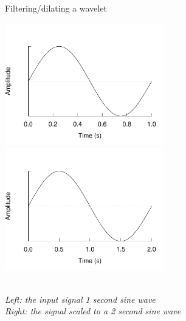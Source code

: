 \begin{figure}[h]
\caption{Filtering/dilating a wavelet}\label{figure:filtering}
\caption*{\\[1em]\footnotesize\emph{Left: the input signal 1 second sine wave\\
Right:
the signal scaled to a 2 second sine wave}\rm}
\centering
	\includegraphics[width=196pt]{images/sine_full.pdf}
	\hspace{1em}
	\includegraphics[width=196pt]{images/sine_scaled.pdf}
\end{figure}